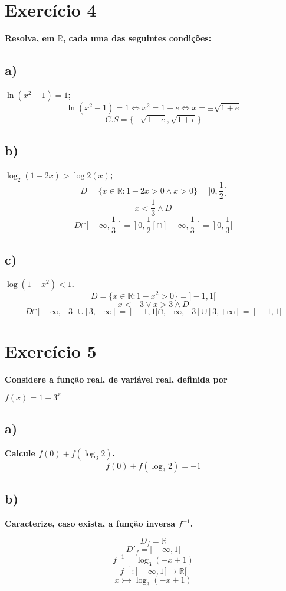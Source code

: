 \documentclass[a4paper]{article}
\begin{document}
	\section*{Exercício 4}\textbf{Resolva, em $\mathbb{R}$, cada uma das seguintes condições:}
	\subsection*{a)}\textbf{$\ln(x^2-1)=1$;}
	\[\ln(x^2-1)=1\Leftrightarrow x^2=1+e \Leftrightarrow x = \pm \sqrt{1+e}\]
	\[C.S=\{-\sqrt{1+e},\sqrt{1+e}\}\]
	\subsection*{b)}\textbf{$\log_{2}(1-2x) > \log{2}(x)$;}
	\[D=\{x \in \mathbb{R}:1-2x > 0 \land x > 0\}=]0,\frac{1}{2}[\]
	\[x < \frac{1}{3} \land D\]
	\[D \cap ]-\infty,\frac{1}{3}[=]0,\frac{1}{2}[ \cap ]-\infty,\frac{1}{3}[ = ]0,\frac{1}{3}[ \]
	
	\subsection*{c)}\textbf{$\log(1-x^2) < 1$.}
	\[D=\{x \in \mathbb{R}:1-x^2 > 0\}=]-1,1[\]
	\[x < -3 \lor x > 3 \land D\]
	\[D \cap ]-\infty,-3[\cup ]3,+\infty[=]-1,1[ \cap ,-\infty,-3[\cup ]3,+\infty[ = ]-1,1[ \]
	
	\section*{Exercício 5}\textbf{Considere a função real, de variável real, definida por}
	\begin{center}
		\textbf{$f(x) = 1 - 3^x$	}
	\end{center}
	\subsection*{a)}\textbf{Calcule $f(0) + f(\log_{3}2)$.}
	\[f(0) + f(\log_{3}2)=-1\]
	\subsection*{b)}\textbf{Caracterize, caso exista, a função inversa $f^{-1}$.}
	
	\[D_{f}=\mathbb{R}\]
	\[D'_{f}=]-\infty,1[\]
	\[f^{-1}=\log_{3}\left(-x+1\right)\]
	\[f^{-1}:]-\infty,1[\rightarrow\mathbb{R}[\]
	\[x\rightarrowtail \log_{3}\left(-x+1\right)\]
\end{document}
